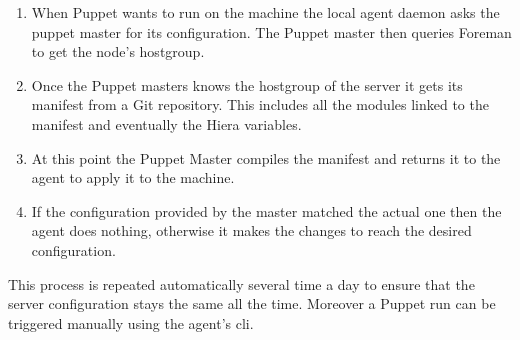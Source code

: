 \begin{enumerate}

\item When Puppet wants to run on the machine the local agent daemon asks
the puppet master for its configuration. The Puppet master then queries
Foreman to get the node's hostgroup.

\item Once the Puppet masters knows the hostgroup of the server it gets
its manifest from a Git repository. This includes all the modules linked
to the manifest and eventually the Hiera variables.

\item At this point the Puppet Master compiles the manifest and returns it
to the agent to apply it to the machine.

\item If the configuration provided by the master matched the actual one
then the agent does nothing, otherwise it makes the changes to reach the
desired configuration.

\end{enumerate}

This process is repeated automatically several time a day to ensure that
the server configuration stays the same all the time. Moreover a Puppet
run can be triggered manually using the agent's cli.

